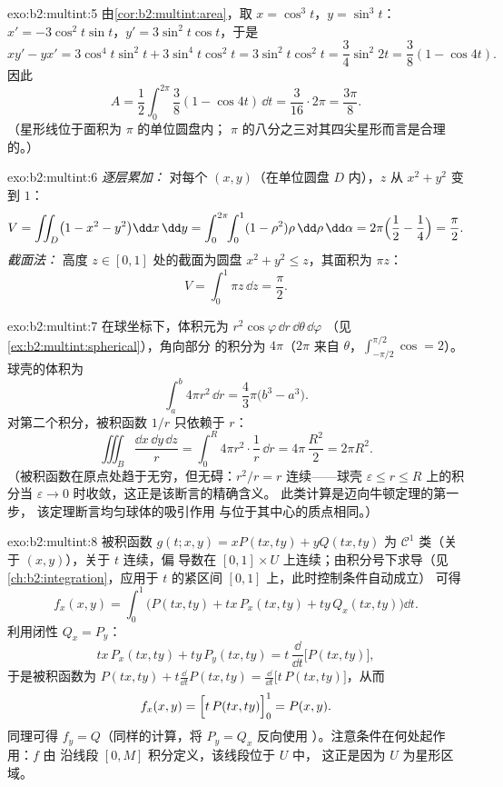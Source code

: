 \begin{solution}{exo:b2:multint:5}
由\cref{cor:b2:multint:area}，取 $x = \cos^3 t$，$y = \sin^3 t$：
$x' = -3\cos^2 t\sin t$，$y' = 3\sin^2 t\cos t$，于是
\[
xy' - yx' = 3\cos^4 t\sin^2 t + 3\sin^4 t\cos^2 t
= 3\sin^2 t\cos^2 t = \frac{3}{4}\sin^2 2t
= \frac{3}{8}(1 - \cos 4t) .
\]
因此
\[
A = \frac12\int_0^{2\pi}\frac38(1 - \cos 4t)\,\dd t
= \frac{3}{16}\cdot 2\pi = \frac{3\pi}{8} .
\]
（星形线位于面积为 $\pi$ 的单位圆盘内；
$\pi$ 的八分之三对其四尖星形而言是合理的。）
\end{solution}

\begin{solution}{exo:b2:multint:6}
\emph{逐层累加：} 对每个 $(x, y)$（在单位圆盘 $D$ 内），$z$
从 $x^2 + y^2$ 变到 $1$：
\[
V = \iint_D \bigl(1 - x^2 - y^2\bigr)\dd x\,\dd y
= \int_0^{2\pi}\!\!\int_0^1 (1 - \rho^2)\rho\,\dd\rho\,\dd\alpha
= 2\pi\Bigl(\frac12 - \frac14\Bigr) = \frac\pi2 .
\]
\emph{截面法：} 高度 $z \in [0, 1]$ 处的截面为圆盘
$x^2 + y^2 \leq z$，其面积为 $\pi z$：
\[
V = \int_0^1 \pi z\,\dd z = \frac\pi2 .
\]
\end{solution}

\begin{solution}{exo:b2:multint:7}
在球坐标下，体积元为
$r^2\cos\varphi\,\dd r\,\dd\theta\,\dd\varphi$
（见\cref{ex:b2:multint:spherical}），角向部分
的积分为 $4\pi$（$2\pi$ 来自 $\theta$，$\int_{-\pi/2}^{\pi/2}\cos = 2$）。
球壳的体积为
\[
\int_a^b 4\pi r^2\,\dd r = \frac43\pi\bigl(b^3 - a^3\bigr).
\]
对第二个积分，被积函数 $1/r$ 只依赖于 $r$：
\[
\iiint_B \frac{\dd x\,\dd y\,\dd z}{r}
= \int_0^R 4\pi r^2\cdot\frac1r\,\dd r
= 4\pi\,\frac{R^2}{2} = 2\pi R^2 .
\]
（被积函数在原点处趋于无穷，但无碍：$r^2/r = r$
连续——球壳 $\varepsilon \leq r
\leq R$ 上的积分当 $\varepsilon \to 0$ 时收敛，这正是该断言的精确含义。
此类计算是迈向牛顿定理的第一步，
该定理断言均匀球体的吸引作用
与位于其中心的质点相同。）
\end{solution}

\begin{solution}{exo:b2:multint:8}
被积函数 $g(t; x, y) = xP(tx, ty) + yQ(tx, ty)$ 为
$\mathcal{C}^1$ 类（关于 $(x, y)$），关于 $t$ 连续，偏
导数在 $[0,1] \times U$ 上连续；由积分号下求导（见
\cref{ch:b2:integration}，应用于
$t$ 的紧区间 $[0,1]$ 上，此时控制条件自动成立）
可得
\[
f_x(x, y)
= \int_0^1 \bigl(P(tx, ty) + tx\,P_x(tx, ty)
+ ty\,Q_x(tx, ty)\bigr)\dd t .
\]
利用闭性 $Q_x = P_y$：
\[
tx\,P_x(tx, ty) + ty\,P_y(tx, ty)
= t\,\frac{\dd}{\dd t}\bigl[P(tx, ty)\bigr] ,
\]
于是被积函数为 $P(tx, ty) + t\frac{\dd}{\dd t}P(tx, ty) =
\frac{\dd}{\dd t}\bigl[t\,P(tx, ty)\bigr]$，从而
\[
f_x(x, y) = \Bigl[t\,P(tx, ty)\Bigr]_0^1 = P(x, y) .
\]
同理可得 $f_y = Q$（同样的计算，将 $P_y = Q_x$ 反向使用
）。注意条件在何处起作用：$f$ 由
沿线段 $[0, M]$ 积分定义，该线段位于 $U$ 中，
这正是因为 $U$ 为星形区域。
\end{solution}

